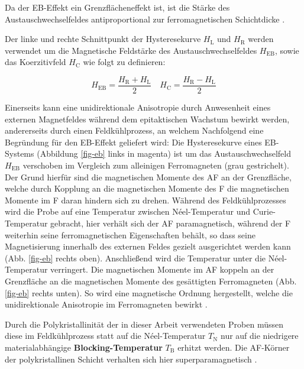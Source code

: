 \documentclass[page,pdftex,12pt,a4paper,twoside,openright]{scrbook}
\begin{document}
Da der EB-Effekt ein Grenzflächeneffekt ist, ist die Stärke des Austauschwechselfeldes antiproportional zur ferromagnetischen Schichtdicke \cite{hohler_exchange_2008}.

Der linke und rechte Schnittpunkt der Hysteresekurve \(H_\mathrm{L}\) und \(H_\mathrm{R}\) werden verwendet um die Magnetische Feldstärke des Austauschwechselfeldes \(H_\mathrm{EB}\), sowie das Koerzitivfeld \(H_\mathrm{C}\) wie folgt zu definieren:

\begin{equation}
H_\mathrm{EB} = \frac{H_\mathrm{R}+ H_\mathrm{L}}{2} \quad H_\mathrm{C} = \frac{H_\mathrm{R} - H_\mathrm{L}}{2}
\end{equation}

Einerseits kann eine unidirektionale Anisotropie durch Anwesenheit eines externen Magnetfeldes während dem epitaktischen Wachstum bewirkt werden, andererseits durch einen Feldkühlprozess, an welchem Nachfolgend eine Begründung für den EB-Effekt geliefert wird: Die Hysteresekurve eines EB-Systems (Abbildung \ref{fig-eb} links in magenta) ist um das Austauschwechselfeld \(H_\mathrm{EB}\) verschoben im Vergleich zum alleinigen Ferromagneten (grau gestrichelt). Der Grund hierfür sind die magnetischen Momente des AF an der Grenzfläche, welche durch Kopplung an die magnetischen Momente des F die magnetischen Momente im F daran hindern sich zu drehen. Während des Feldkühlprozesses wird die Probe auf eine Temperatur zwischen Néel-Temperatur und Curie-Temperatur gebracht, hier verhält sich der AF paramagnetisch, während der F weiterhin seine ferromagnetischen Eigenschaften behält, so dass seine Magnetisierung innerhalb des externen Feldes gezielt ausgerichtet werden kann (Abb. \ref{fig-eb} rechts oben). Anschließend wird die Temperatur unter die Néel-Temperatur verringert. Die magnetischen Momente im AF koppeln an der Grenzfläche an die magnetischen Momente des gesättigten Ferromagneten (Abb. \ref{fig-eb} rechts unten). So wird eine magnetische Ordnung hergestellt, welche die unidirektionale Anisotropie im Ferromagneten bewirkt \cite{merkel_einfluss_2018}.

Durch die Polykristallinität der in dieser Arbeit verwendeten Proben müssen diese im Feldkühlprozess statt auf die Néel-Temperatur \(T_\mathrm{N}\) nur auf die niedrigere materialabhängige \textbf{Blocking-Temperatur} \(T_\mathrm{B}\) erhitzt werden. Die AF-Körner der polykristallinen Schicht verhalten sich hier superparamagnetisch \cite{ogrady_new_2010,bean_superparamagnetism_1959}.
\end{document}
